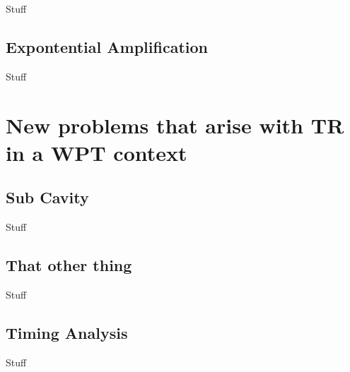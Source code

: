 Stuff

\subsection{Expontential Amplification}

Stuff
\section{New problems that arise with TR in a WPT context}


\label{sec:future-wpt}

\subsection{Sub Cavity}

Stuff

\subsection{That other thing}

Stuff

\subsection{Timing Analysis}

Stuff
